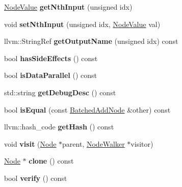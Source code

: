 \begin{DoxyCompactItemize}
\item 
\mbox{\label{classglow_1_1_batched_add_node_a4dca70d06013c76ffaff580dd731e6ed}} 
\hyperlink{structglow_1_1_node_value}{Node\+Value} {\bfseries get\+Nth\+Input} (unsigned idx)
\item 
\mbox{\label{classglow_1_1_batched_add_node_a626e4fc620587cc09a1d09448e090200}} 
void {\bfseries set\+Nth\+Input} (unsigned idx, \hyperlink{structglow_1_1_node_value}{Node\+Value} val)
\item 
\mbox{\label{classglow_1_1_batched_add_node_a43b7e6d3f6793f8ecf22f591fdbcf129}} 
llvm\+::\+String\+Ref {\bfseries get\+Output\+Name} (unsigned idx) const
\item 
\mbox{\label{classglow_1_1_batched_add_node_acacbfb44a2b611e4c21e6c8e86ce6cc3}} 
bool {\bfseries has\+Side\+Effects} () const
\item 
\mbox{\label{classglow_1_1_batched_add_node_acc88bec7328402ed7452f84296e17d00}} 
bool {\bfseries is\+Data\+Parallel} () const
\item 
\mbox{\label{classglow_1_1_batched_add_node_ad55a0cc4e86cbc7a8f539f1f365352cf}} 
std\+::string {\bfseries get\+Debug\+Desc} () const
\item 
\mbox{\label{classglow_1_1_batched_add_node_a06f28d6b3ab0cdff39d65f2b58fcc708}} 
bool {\bfseries is\+Equal} (const \hyperlink{classglow_1_1_batched_add_node}{Batched\+Add\+Node} \&other) const
\item 
\mbox{\label{classglow_1_1_batched_add_node_a73e71e29ba1306cc6b1de4cf3948cf39}} 
llvm\+::hash\+\_\+code {\bfseries get\+Hash} () const
\item 
\mbox{\label{classglow_1_1_batched_add_node_a8cf66176c72cb97ccf7bd36fe8f3b52a}} 
void {\bfseries visit} (\hyperlink{classglow_1_1_node}{Node} $\ast$parent, \hyperlink{classglow_1_1_node_walker}{Node\+Walker} $\ast$visitor)
\item 
\mbox{\label{classglow_1_1_batched_add_node_a5356bf28aaefa52611dc26b9ee7ed3c7}} 
\hyperlink{classglow_1_1_node}{Node} $\ast$ {\bfseries clone} () const
\item 
\mbox{\label{classglow_1_1_batched_add_node_ac236bb9a4f8b216f646debdd1a9428c5}} 
bool {\bfseries verify} () const
\end{DoxyCompactItemize}
